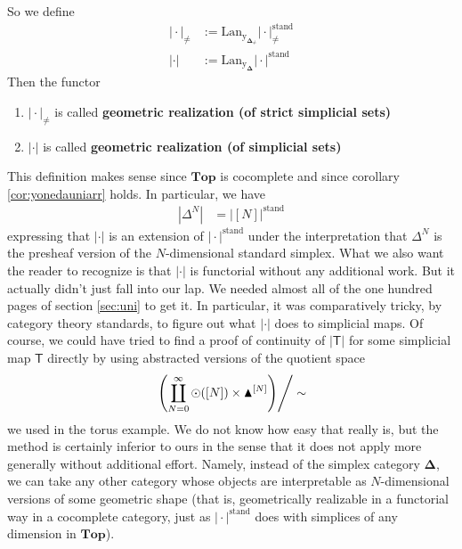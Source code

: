 So we define
\begin{align*}
  \vert
    \cdot
  \vert_{\neq}
  &:=
  \mathrm{Lan}_{\mathrm{y_{\mathbf{\Delta}_{\neq}}}}
  \vert
    \cdot
  \vert_{\neq}^{\textrm{stand}}
  \\
  \vert
    \cdot
  \vert
  &:=
  \mathrm{Lan}_{\mathrm{y_{\mathbf{\Delta}}}}
  \vert
    \cdot
  \vert^{\textrm{stand}}
\end{align*}
Then the functor
\begin{enumerate}
\item[(1)]
$\vert \cdot \vert_{\neq}$ is called \textbf{geometric realization (of strict simplicial sets)}
\item[(2)]
$\vert \cdot \vert$ is called \textbf{geometric realization (of simplicial sets)}
\end{enumerate}
This definition makes sense since $\mathbf{Top}$ is cocomplete and since corollary \ref{cor:yonedauniarr} holds.
In particular, we have
\begin{align*}
  \left\vert
    \Delta^{N}
  \right\vert
  &=
  \left\vert
    [N]
  \right\vert^{\textrm{stand}}
\end{align*}
expressing that $\vert \cdot \vert$ is an extension of $\vert \cdot \vert^{\textrm{stand}}$ under the interpretation that $\Delta^{N}$ is the presheaf version of the $N$-dimensional standard simplex.
What we also want the reader to recognize is that $\vert \cdot \vert$ is functorial without any additional work.
But it actually didn't just fall into our lap.
We needed almost all of the one hundred pages of section \ref{sec:uni} to get it.
In particular, it was comparatively tricky, by category theory standards, to figure out what $\vert \cdot \vert$ does to simplicial maps.
Of course, we could have tried to find a proof of continuity of $\vert \mathsf{T} \vert$ for some simplicial map $\mathsf{T}$ directly by using abstracted versions of the quotient space
\begin{align*}
  \left.
    \left(
      \coprod_{N=0}^{\infty}
      \odot([N])
      \times
      \blacktriangle^{[N]}
    \right)
  \right\slash
  \sim
\end{align*}
we used in the torus example.
We do not know how easy that really is, but the method is certainly inferior to ours in the sense that it does not apply more generally without additional effort.
Namely, instead of the simplex category $\mathbf{\Delta}$, we can take any other category whose objects are interpretable as $N$-dimensional versions of some geometric shape (that is, geometrically realizable in a functorial way in a cocomplete category, just as $\vert \cdot \vert^{\textrm{stand}}$ does with simplices of any dimension in $\mathbf{Top}$).
